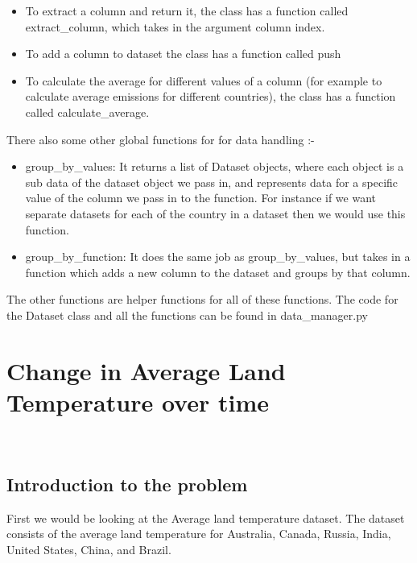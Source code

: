 \documentclass[a4paper, 11pt]{report}
\begin{document}
\begin{itemize}
    \item To extract a column and return it, the class has a function called extract\_column, which takes in the argument column index.\\

    \item To add a column to dataset the class has a function called push\\

    \item To calculate the average for different values of a column (for example to calculate average emissions for different countries), the class has a function called calculate\_average. \\

\end{itemize}

   There also some other global functions for for data handling :-

   \begin{itemize}
       \item group\_by\_values: It returns a list of Dataset objects, where each object is a sub data of the dataset object we pass in, and represents data for a specific value of the column we pass in to the function. For instance if we want separate datasets for each of the country in a dataset then we would use this function.  \\

       \item group\_by\_function: It does the same job as group\_by\_values, but takes in a function which adds a new column to the dataset and groups by that column. \\

   \end{itemize}

   The other functions are helper functions for all of these functions. The code for the Dataset class and all the functions can be found in data\_manager.py

\newpage

\section{Change in Average Land Temperature over time}
~\\
\subsection{Introduction to the problem}
First we would be looking at the Average land temperature dataset. The dataset consists of the average land temperature for Australia, Canada, Russia, India, United States, China, and Brazil. \\
\end{document}
